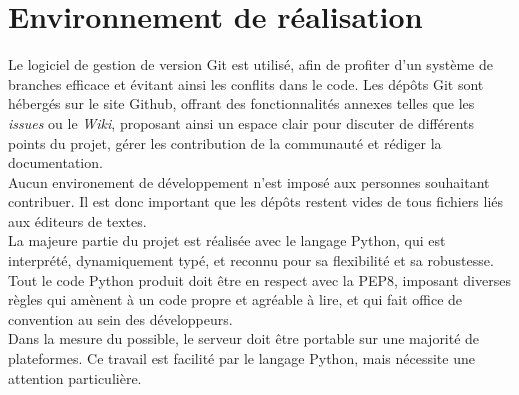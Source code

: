 \section{Environnement de réalisation}
Le logiciel de gestion de version Git est utilisé, afin de profiter d'un système de branches efficace et évitant ainsi les conflits dans le code.
Les dépôts Git sont hébergés sur le site Github, offrant des fonctionnalités annexes telles que les \textit{issues} ou le \textit{Wiki}, proposant ainsi un espace clair pour discuter de différents points du projet, gérer les contribution de la communauté et rédiger la documentation.\\

Aucun environement de développement n'est imposé aux personnes souhaitant contribuer. Il est donc important que les dépôts restent vides de tous fichiers liés aux éditeurs de textes.\\

La majeure partie du projet est réalisée avec le langage Python, qui est interprété, dynamiquement typé, et reconnu pour sa flexibilité et sa robustesse.\\
Tout le code Python produit doit être en respect avec la PEP8, imposant diverses règles qui amènent à un code propre et agréable à lire, et qui fait office de convention au sein des développeurs.\\

Dans la mesure du possible, le serveur doit être portable sur une majorité de plateformes. Ce travail est facilité par le langage Python, mais nécessite une attention particulière.
